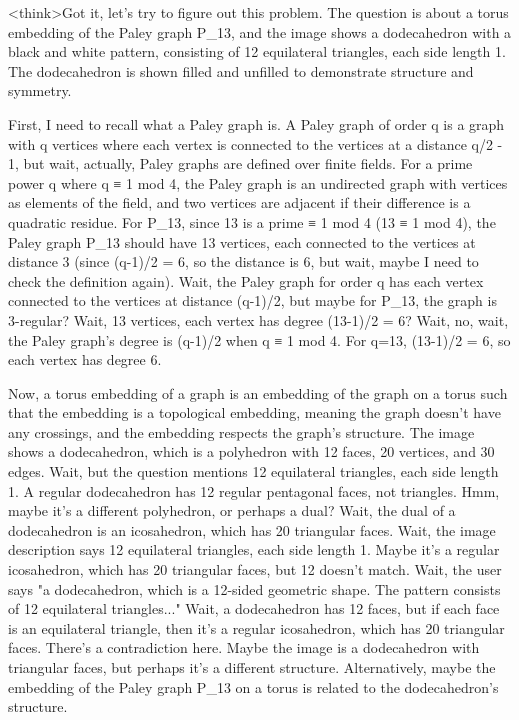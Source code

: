 <think>Got it, let's try to figure out this problem. The question is about a torus embedding of the Paley graph P_13, and the image shows a dodecahedron with a black and white pattern, consisting of 12 equilateral triangles, each side length 1. The dodecahedron is shown filled and unfilled to demonstrate structure and symmetry. 

First, I need to recall what a Paley graph is. A Paley graph of order q is a graph with q vertices where each vertex is connected to the vertices at a distance q/2 - 1, but wait, actually, Paley graphs are defined over finite fields. For a prime power q where q ≡ 1 mod 4, the Paley graph is an undirected graph with vertices as elements of the field, and two vertices are adjacent if their difference is a quadratic residue. For P_13, since 13 is a prime ≡ 1 mod 4 (13 ≡ 1 mod 4), the Paley graph P_13 should have 13 vertices, each connected to the vertices at distance 3 (since (q-1)/2 = 6, so the distance is 6, but wait, maybe I need to check the definition again). Wait, the Paley graph for order q has each vertex connected to the vertices at distance (q-1)/2, but maybe for P_13, the graph is 3-regular? Wait, 13 vertices, each vertex has degree (13-1)/2 = 6? Wait, no, wait, the Paley graph's degree is (q-1)/2 when q ≡ 1 mod 4. For q=13, (13-1)/2 = 6, so each vertex has degree 6. 

Now, a torus embedding of a graph is an embedding of the graph on a torus such that the embedding is a topological embedding, meaning the graph doesn't have any crossings, and the embedding respects the graph's structure. The image shows a dodecahedron, which is a polyhedron with 12 faces, 20 vertices, and 30 edges. Wait, but the question mentions 12 equilateral triangles, each side length 1. A regular dodecahedron has 12 regular pentagonal faces, not triangles. Hmm, maybe it's a different polyhedron, or perhaps a dual? Wait, the dual of a dodecahedron is an icosahedron, which has 20 triangular faces. Wait, the image description says 12 equilateral triangles, each side length 1. Maybe it's a regular icosahedron, which has 20 triangular faces, but 12 doesn't match. Wait, the user says "a dodecahedron, which is a 12-sided geometric shape. The pattern consists of 12 equilateral triangles..." Wait, a dodecahedron has 12 faces, but if each face is an equilateral triangle, then it's a regular icosahedron, which has 20 triangular faces. There's a contradiction here. Maybe the image is a dodecahedron with triangular faces, but perhaps it's a different structure. Alternatively, maybe the embedding of the Paley graph P_13 on a torus is related to the dodecahedron's structure. 


